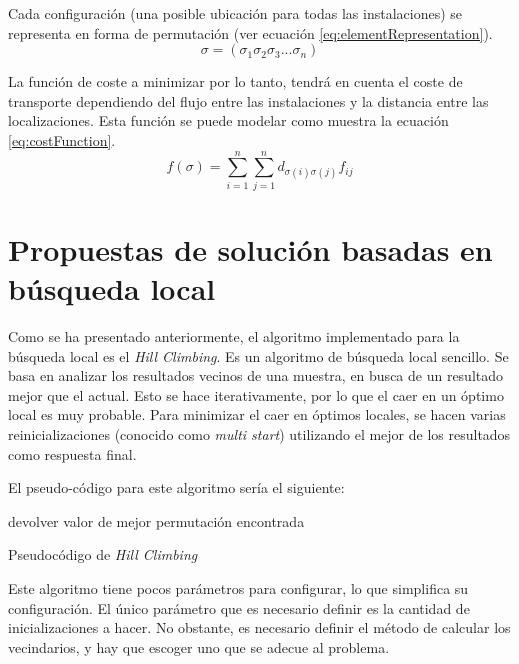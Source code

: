 \documentclass[10pt,a4paper]{article}
\begin{document}
Cada configuración (una posible ubicación para todas las instalaciones) se representa en forma de permutación (ver ecuación \ref{eq:elementRepresentation}).
\begin{equation}
\sigma = (\sigma_1\sigma_2\sigma_3...\sigma_n)
\label{eq:elementRepresentation}
\end{equation}

La función de coste a minimizar por lo tanto, tendrá en cuenta el coste de transporte dependiendo del flujo entre las instalaciones y la distancia entre las localizaciones. Esta función se puede modelar como muestra la ecuación \ref{eq:costFunction}.
\begin{equation}
f(\sigma)=\sum^n_{i=1}\sum^n_{j=1}d_{\sigma(i)\sigma(j)}f_{ij}
\label{eq:costFunction}
\end{equation}

\section{Propuestas de solución basadas en búsqueda local}
Como se ha presentado anteriormente, el algoritmo implementado para la búsqueda local es el \textit{Hill Climbing}. Es un algoritmo de búsqueda local sencillo. Se basa en analizar los resultados vecinos de una muestra, en busca de un resultado mejor que el actual. Esto se hace iterativamente, por lo que el caer en un óptimo local es muy probable. Para minimizar el caer en óptimos locales, se hacen varias reinicializaciones (conocido como \textit{multi start}) utilizando el mejor de los resultados como respuesta final.

El pseudo-código para este algoritmo sería el siguiente:

\begin{algorithm}[H]
 devolver valor de mejor permutación encontrada
 \caption{Pseudocódigo de \textit{Hill Climbing}}
\end{algorithm}

Este algoritmo tiene pocos parámetros para configurar, lo que simplifica su configuración. El único parámetro que es necesario definir es la cantidad de inicializaciones a hacer. No obstante, es necesario definir el método de calcular los vecindarios, y hay que escoger uno que se adecue al problema. 
\end{document}
